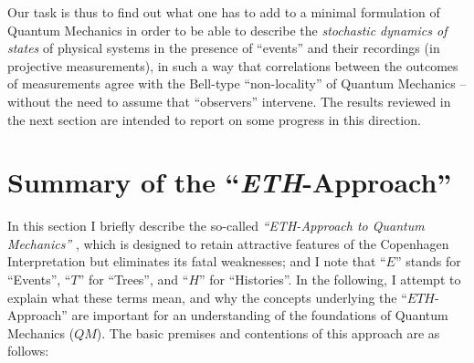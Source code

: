 \documentclass[12pt]{article}
\begin{document}
Our task is thus to find out what one has to add to a minimal formulation of Quantum Mechanics in order to be able to describe the \textit{stochastic dynamics of states} of physical systems in the presence of ``events'' and their recordings (in projective measurements), in such a way that correlations between the outcomes of measurements agree with the Bell-type ``non-locality'' of Quantum Mechanics -- without the need to assume that ``observers'' intervene. The results reviewed in the next section are intended to report on some progress in this direction.

\section{Summary of the ``\textit{ETH}-Approach''}
In this section I briefly describe the so-called \textit{``ETH-Approach to Quantum Mechanics''} \cite{FS-Prob-Theory, BFS-forks, Schubnel-thesis, Les-Diablerets, FFS, FS-state-prep}, which is designed to retain attractive features of the Copenhagen Interpretation but eliminates its fatal weaknesses; and I note that ``$E$'' stands for ``Events'', ``$T$'' for ``Trees'', and ``$H$'' for ``Histories''. In the following, I attempt to explain what these terms mean, and why the concepts underlying the ``$\textit{ETH}$-Approach'' are important for an understanding of the foundations of Quantum Mechanics ($QM$). The basic premises and contentions of this approach are as follows:
\end{document}
